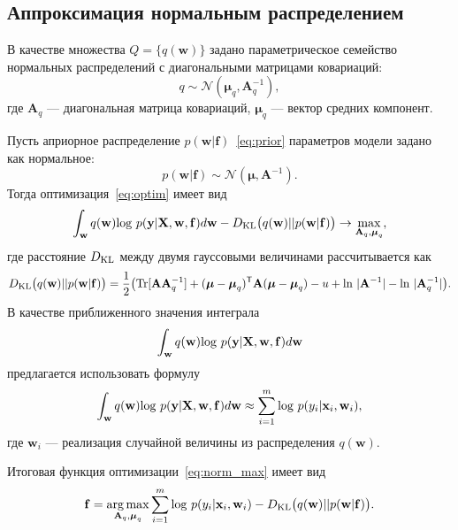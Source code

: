 \documentclass[12pt]{a&t}
\DeclareMathOperator*{\argmax}{arg\,max}
\begin{document}
\subsection{Аппроксимация нормальным распределением}
В качестве множества $Q = \{q(\mathbf{w})\}$ задано параметрическое семейство нормальных распределений с диагональными матрицами ковариаций:
\begin{equation}
\label{eq:diag}
	q \sim \mathcal{N}(\boldsymbol{\mu}_q, \mathbf{A}^{-1}_q),
\end{equation}
где $\mathbf{A}_q$ --- диагональная матрица ковариаций, $\boldsymbol{\mu}_q$ --- вектор средних компонент.

Пусть априорное распределение $p(\mathbf{w}|\mathbf{f})$~\eqref{eq:prior} параметров модели задано как нормальное:
\[
	p(\mathbf{w}|\mathbf{f}) \sim \mathcal{N}(\boldsymbol{\mu}, \mathbf{A}^{-1}).
\] 
Тогда оптимизация~\eqref{eq:optim} имеет вид
\begin{equation}
\label{eq:norm_max}
 \int_{\mathbf{w}} q(\mathbf{w})\textnormal{log}~{p(\mathbf{y}|\mathbf{X},\mathbf{w},\mathbf{f})} d \mathbf{w} - D_\textnormal{KL}\bigl(q (\mathbf{w} )|| p (\mathbf{w}|\mathbf{f})\bigr) \to \max_{\mathbf{A}_q, \boldsymbol{\mu}_q},
\end{equation}
где расстояние $D_\textnormal{KL}$ между двумя гауссовыми величинами рассчитывается как 
\[
	D_\textnormal{KL}\bigl(q (\mathbf{w}) || p (\mathbf{w}|\mathbf{f})\bigr) = \frac{1}{2} \bigl( \textnormal{Tr} [\mathbf{A}\mathbf{A}^{-1}_q] + (\boldsymbol{\mu} - \boldsymbol{\mu}_q)^\mathsf{T}\mathbf{A}(\boldsymbol{\mu} - \boldsymbol{\mu}_q) - u +\textnormal{ln}~|\mathbf{A}^{-1}| - \textnormal{ln}~|\mathbf{A}_q^{-1}| \bigr).
\]
В качестве приближенного значения интеграла $$\int_{\mathbf{w}} q(\mathbf{w})\textnormal{log}~{p(\mathbf{y}|\mathbf{X},\mathbf{w},\mathbf{f})} d \mathbf{w}$$ предлагается использовать формулу
\[
\int_{\mathbf{w}} q(\mathbf{w})\textnormal{log}~{p(\mathbf{y}|\mathbf{X},\mathbf{w},\mathbf{f})} d \mathbf{w} \approx \sum_{i=1}^m \textnormal{log}~p({y}_i|\mathbf{x}_i, \mathbf{w}_i),
\]
где $\mathbf{w}_i$  --- реализация случайной величины из распределения $q(\mathbf{w})$.

Итоговая функция оптимизации~\eqref{eq:norm_max} имеет вид
\begin{equation}
\label{eq:gaus}
	\mathbf{f} = \argmax_{\mathbf{A}_q, \boldsymbol{\mu}_q} \sum_{i=1}^m \textnormal{log}~p({y}_i|\mathbf{x}_i, \mathbf{w}_i) - D_\textnormal{KL}\bigl(q (\mathbf{w} )|| p (\mathbf{w}|\mathbf{f})\bigr).
\end{equation}
\end{document}
